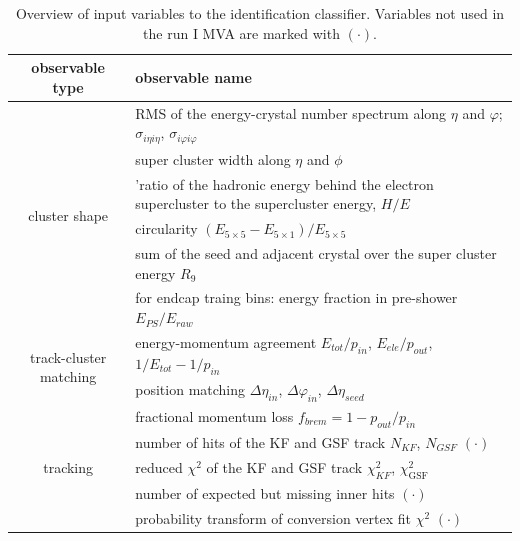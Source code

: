  \begin{table}[h!]
\scriptsize
    \centering
    \begin{tabular}{c|l}
\hline %
\hline %
observable type    &  observable name      	\\
\hline %

\multirow{6}{*}{cluster shape}
	&  RMS of the energy-crystal number spectrum along $\eta$ and $\varphi$; $\sigma_{i\eta i\eta}$, $\sigma_{i\varphi i\varphi}$		\\
	&  super cluster width along $\eta$ and $\phi$		\\
	&  'ratio of the hadronic energy behind the electron 
supercluster to the supercluster energy, $H/E$			\\
	&  circularity $(E_{5\times5} - E_{5\times1})/E_{5\times5}$			\\
	&  sum of the seed and adjacent crystal over the super cluster energy $R_{9}$			\\
	&  for endcap traing bins: energy fraction in pre-shower $E_{PS}/E_{raw}$			\\
\hline
\multirow{2}{*}{track-cluster matching}
	& energy-momentum agreement $E_{tot}/p_{in}$, $E_{ele}/p_{out}$, $1/E_{tot} - 1/p_{in}$ 			\\
	& position matching $\Delta\eta_{in}$, $\Delta\varphi_{in}$, $\Delta\eta_{seed}$			\\
\hline
\multirow{5}{*}{tracking}
        & fractional momentum loss $f_{brem} = 1 - p_{out}/p_{in}$	\\
        & number of hits of the KF and GSF track $N_{KF}$, $N_{GSF}$ $(\mathord{\cdot})$ \\
        & reduced $\chi^2$ of the KF and GSF track $\chi^{2}_{KF}$, $\chi^{2}_{\textrm{GSF}}$ \\
        & number of expected but missing inner hits $(\mathord{\cdot})$ 	\\
        & probability transform of conversion vertex fit $\chi^2$ $(\mathord{\cdot})$ \\

\hline %
\hline %
     \end{tabular}
\small
    \caption{Overview of input variables to the identification classifier. Variables not used in the run I MVA are marked with  $(\mathord{\cdot})$.}
    \label{tab:ele_ID_input_variables}
\end{table}


